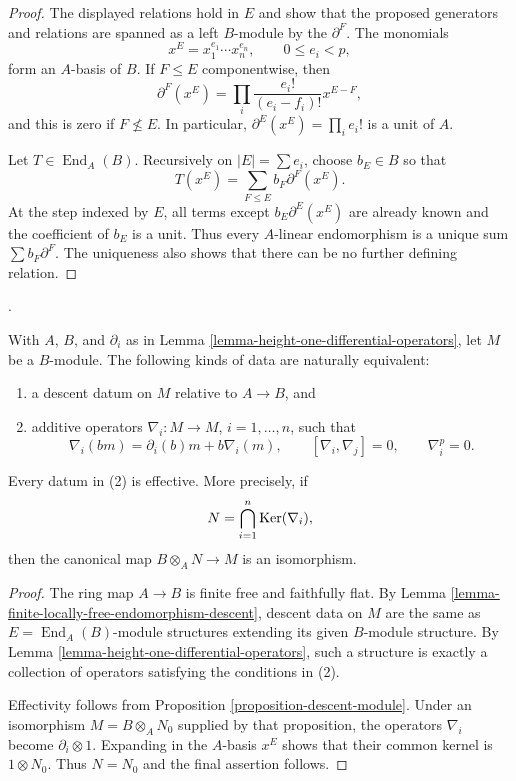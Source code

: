 \begin{proof}
The displayed relations hold in $E$ and show that the proposed generators
and relations are spanned as a left $B$-module by the $\partial^F$.
The monomials
$$
x^E = x_1^{e_1} \cdots x_n^{e_n},
\qquad 0 \leq e_i < p,
$$
form an $A$-basis of $B$. If $F \leq E$ componentwise, then
$$
\partial^F(x^E) =
\prod_i \frac{e_i!}{(e_i-f_i)!} x^{E-F},
$$
and this is zero if $F \not\leq E$. In particular,
$\partial^E(x^E) = \prod_i e_i!$ is a unit of $A$.

Let $T \in \operatorname{End}_A(B)$. Recursively on $|E| = \sum e_i$,
choose $b_E \in B$
so that
$$
T(x^E) = \sum_{F \leq E} b_F\partial^F(x^E).
$$
At the step indexed by $E$, all terms except $b_E\partial^E(x^E)$
are already known and the coefficient of $b_E$ is a unit. Thus every
$A$-linear endomorphism is a unique sum $\sum b_F\partial^F$.
The uniqueness also shows that there can be no further defining relation.
\end{proof}

\begin{proposition}
\label{proposition-cartier-descent-modules}
\begin{reference}
\cite[Expos\'e 190, n\textsuperscript{o} 3, pp. 321--322]{FGA}.
\end{reference}
With $A$, $B$, and $\partial_i$ as in
Lemma \ref{lemma-height-one-differential-operators}, let $M$ be a $B$-module.
The following kinds of data are naturally equivalent:
\begin{enumerate}
\item a descent datum on $M$ relative to $A \to B$, and
\item additive operators $\nabla_i : M \to M$, $i = 1, \ldots, n$, such that
$$
\nabla_i(bm) = \partial_i(b)m + b\nabla_i(m),
\qquad
[\nabla_i, \nabla_j] = 0,
\qquad
\nabla_i^p = 0.
$$
\end{enumerate}
Every datum in (2) is effective. More precisely, if
$$
N = \bigcap_{i = 1}^n \mathop{\mathrm{Ker}}(\nabla_i),
$$
then the canonical map $B \otimes_A N \to M$ is an isomorphism.
\end{proposition}

\begin{proof}
The ring map $A \to B$ is finite free and faithfully flat. By
Lemma \ref{lemma-finite-locally-free-endomorphism-descent}, descent data on
$M$ are the same as $E = \operatorname{End}_A(B)$-module structures
extending its given
$B$-module structure. By
Lemma \ref{lemma-height-one-differential-operators}, such a structure is
exactly a collection of operators satisfying the conditions in (2).

Effectivity follows from Proposition \ref{proposition-descent-module}.
Under an isomorphism $M = B \otimes_A N_0$ supplied by that proposition,
the operators $\nabla_i$ become $\partial_i \otimes 1$. Expanding in the
$A$-basis $x^E$ shows that their common kernel is $1 \otimes N_0$.
Thus $N = N_0$ and the final assertion follows.
\end{proof}

